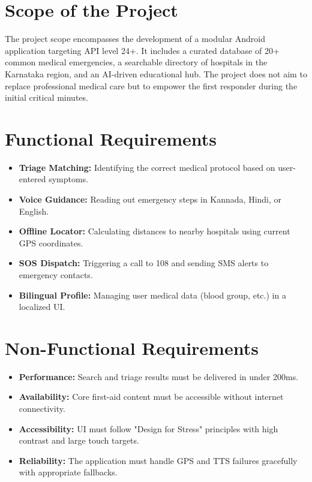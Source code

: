 \documentclass[12pt,a4paper]{report}
\begin{document}
\section{Scope of the Project}
The project scope encompasses the development of a modular Android application targeting API level 24+. It includes a curated database of 20+ common medical emergencies, a searchable directory of hospitals in the Karnataka region, and an AI-driven educational hub. The project does not aim to replace professional medical care but to empower the first responder during the initial critical minutes.

\section{Functional Requirements}
\begin{itemize}
    \item \textbf{Triage Matching:} Identifying the correct medical protocol based on user-entered symptoms.
    \item \textbf{Voice Guidance:} Reading out emergency steps in Kannada, Hindi, or English.
    \item \textbf{Offline Locator:} Calculating distances to nearby hospitals using current GPS coordinates.
    \item \textbf{SOS Dispatch:} Triggering a call to 108 and sending SMS alerts to emergency contacts.
    \item \textbf{Bilingual Profile:} Managing user medical data (blood group, etc.) in a localized UI.
\end{itemize}

\section{Non-Functional Requirements}
\begin{itemize}
    \item \textbf{Performance:} Search and triage results must be delivered in under 200ms.
    \item \textbf{Availability:} Core first-aid content must be accessible without internet connectivity.
    \item \textbf{Accessibility:} UI must follow "Design for Stress" principles with high contrast and large touch targets.
    \item \textbf{Reliability:} The application must handle GPS and TTS failures gracefully with appropriate fallbacks.
\end{itemize}
\end{document}
